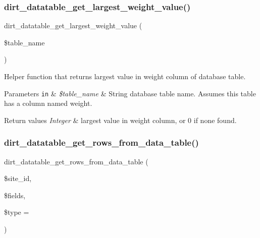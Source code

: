 \subsubsection{\texorpdfstring{dirt\+\_\+datatable\+\_\+get\+\_\+largest\+\_\+weight\+\_\+value()}{dirt\_datatable\_get\_largest\_weight\_value()}}
{\footnotesize\ttfamily dirt\+\_\+datatable\+\_\+get\+\_\+largest\+\_\+weight\+\_\+value (\begin{DoxyParamCaption}\item[{}]{\$table\+\_\+name }\end{DoxyParamCaption})}

Helper function that returns largest value in \textquotesingle{}weight\textquotesingle{} column of database table.


\begin{DoxyParams}[1]{Parameters}
\mbox{\tt in}  & {\em \$table\+\_\+name} & String database table name. Assumes this table has a column named \textquotesingle{}weight\textquotesingle{}.\\
\hline
\end{DoxyParams}

\begin{DoxyRetVals}{Return values}
{\em Integer} & largest value in \textquotesingle{}weight\textquotesingle{} column, or 0 if none found. \\
\hline
\end{DoxyRetVals}
\mbox{\label{dirt__datatable_8search__table__db__ops_8inc_a4bdea2f8554f919404d343d3b274e0eb}} 
\subsubsection{\texorpdfstring{dirt\+\_\+datatable\+\_\+get\+\_\+rows\+\_\+from\+\_\+data\+\_\+table()}{dirt\_datatable\_get\_rows\_from\_data\_table()}}
{\footnotesize\ttfamily dirt\+\_\+datatable\+\_\+get\+\_\+rows\+\_\+from\+\_\+data\+\_\+table (\begin{DoxyParamCaption}\item[{}]{\$site\+\_\+id,  }\item[{}]{\$fields,  }\item[{}]{\$type = {\ttfamily \textquotesingle{}\textquotesingle{}} }\end{DoxyParamCaption})}

